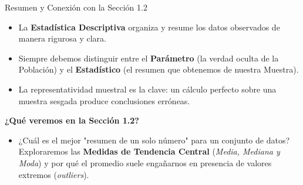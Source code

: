 \documentclass[10pt,aspectratio=169]{beamer}
\begin{document}
\begin{frame}{Resumen y Conexión con la Sección 1.2}
  \begin{itemize}
    \item La \textbf{Estadística Descriptiva} organiza y resume los datos observados de manera rigurosa y clara. \pause
    \item Siempre debemos distinguir entre el \textbf{Parámetro} (la verdad oculta de la Población) y el \textbf{Estadístico} (el resumen que obtenemos de nuestra Muestra). \pause
    \item La representatividad muestral es la clave: un cálculo perfecto sobre una muestra sesgada produce conclusiones erróneas.
  \end{itemize}

  \vspace{0.6em}
  \pause
  {\large \color{TecAzulOscuro}\textbf{¿Qué veremos en la Sección 1.2?}}
  \vspace{0.2em}
  \begin{itemize}
    \item ¿Cuál es el mejor "resumen de un solo número" para un conjunto de datos? Exploraremos las \textbf{Medidas de Tendencia Central} (\emph{Media, Mediana y Moda}) y por qué el promedio suele engañarnos en presencia de valores extremos (\emph{outliers}).
  \end{itemize}
\end{frame}
\end{document}
